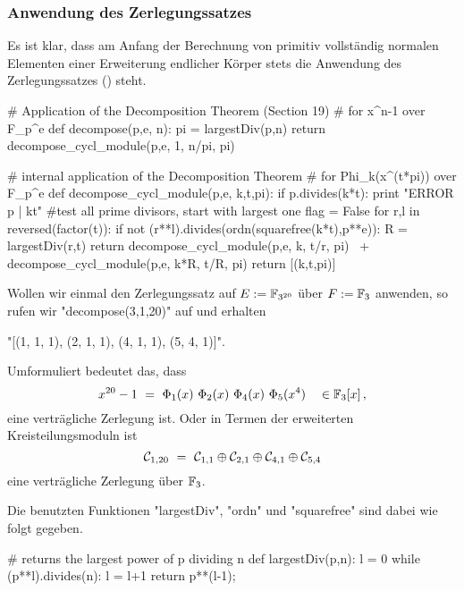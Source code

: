 \subsubsection{Anwendung des Zerlegungssatzes}
Es ist klar, dass am Anfang der Berechnung von primitiv vollständig normalen
Elementen einer Erweiterung endlicher Körper stets die Anwendung des
Zerlegungssatzes () steht.


\begin{sagecode}[caption={Aus \url{../Sage/enumeratePCNs.spyx}},
  label=lst:decompose]
# Application of the Decomposition Theorem (Section 19)
# for x^n-1 over F_p^e
def decompose(p,e, n):
    pi = largestDiv(p,n)
    return decompose_cycl_module(p,e, 1, n/pi, pi)
\end{sagecode}


\begin{sagecode}[caption={Aus \url{../Sage/enumeratePCNs.spyx}},
  label=lst:decompose_cycl_module]
# internal application of the Decomposition Theorem
# for Phi_k(x^(t*pi)) over F_p^e
def decompose_cycl_module(p,e, k,t,pi):
    if p.divides(k*t): print "ERROR p | kt"
    #test all prime divisors, start with largest one
    flag = False
    for r,l in reversed(factor(t)):
        if not (r**l).divides(ordn(squarefree(k*t),p**e)):
            R = largestDiv(r,t)
            return decompose_cycl_module(p,e, k, t/r, pi) \
                    + decompose_cycl_module(p,e, k*R, t/R, pi)
    return [(k,t,pi)]
\end{sagecode}

\begin{beispiel}
  Wollen wir einmal den Zerlegungssatz auf $E := \mathbb{F}_{3^{20}}$ über 
  $F := \mathbb{F}_3$ anwenden, so rufen wir "decompose(3,1,20)" auf und 
  erhalten
  \begin{center}
    "[(1, 1, 1), (2, 1, 1), (4, 1, 1), (5, 4, 1)]".
  \end{center}
  Umformuliert bedeutet das, dass
  \[ x^{20} - 1 \ =\  \Phi_1(x)\ \Phi_2(x)\ \Phi_4(x)\ \Phi_5(x^4)\quad
    \in \mathbb{F}_3[x]\,,\]
  eine verträgliche Zerlegung ist. 
  Oder in Termen der erweiterten Kreisteilungsmoduln ist 
  \[ \mathcal{C}_{1,20} \ =\  \mathcal{C}_{1,1} \oplus \mathcal{C}_{2,1} \oplus
    \mathcal{C}_{4,1} \oplus \mathcal{C}_{5,4}\]
  eine verträgliche Zerlegung über $\mathbb{F}_3$.
\end{beispiel}

Die benutzten Funktionen "largestDiv", "ordn" und "squarefree" sind dabei 
wie folgt gegeben.

\begin{sagecode}[caption={Aus \url{../Sage/enumeratePCNs.spyx}}]
# returns the largest power of p dividing n
def largestDiv(p,n):
    l = 0
    while (p**l).divides(n):
        l = l+1
    return p**(l-1);
\end{sagecode}


